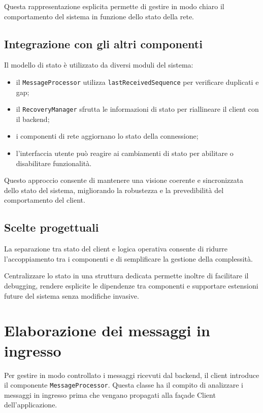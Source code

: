 \documentclass[a4paper, 11pt, twoside]{report}
\begin{document}
Questa rappresentazione esplicita permette di gestire in modo chiaro il comportamento del sistema in funzione dello stato della rete.

\subsection{Integrazione con gli altri componenti}

Il modello di stato è utilizzato da diversi moduli del sistema:

\begin{itemize}
    \item il \texttt{MessageProcessor} utilizza \texttt{lastReceivedSequence} per verificare duplicati e gap;
    \item il \texttt{RecoveryManager} sfrutta le informazioni di stato per riallineare il client con il backend;
    \item i componenti di rete aggiornano lo stato della connessione;
    \item l'interfaccia utente può reagire ai cambiamenti di stato per abilitare o disabilitare funzionalità.
\end{itemize}

Questo approccio consente di mantenere una visione coerente e sincronizzata dello stato del sistema, migliorando la robustezza e la
prevedibilità del comportamento del client.

\subsection{Scelte progettuali}

La separazione tra stato del client e logica operativa consente di ridurre l'accoppiamento tra i componenti e di semplificare la
gestione della complessità.

Centralizzare lo stato in una struttura dedicata permette inoltre di facilitare il debugging, rendere esplicite le dipendenze tra
componenti e supportare estensioni future del sistema senza modifiche invasive.

\section{Elaborazione dei messaggi in ingresso}

Per gestire in modo controllato i messaggi ricevuti dal backend, il client introduce il componente \texttt{MessageProcessor}.
Questa classe ha il compito di analizzare i messaggi in ingresso prima che vengano propagati alla façade Client dell'applicazione.
\end{document}
